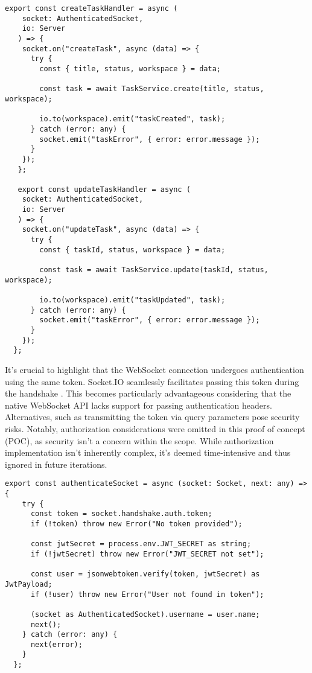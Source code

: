 \begin{lstlisting}[caption=WebSocket task events handlers]
  export const createTaskHandler = async (
    socket: AuthenticatedSocket,
    io: Server
   ) => {
    socket.on("createTask", async (data) => {
      try {
        const { title, status, workspace } = data;
   
        const task = await TaskService.create(title, status, workspace);
   
        io.to(workspace).emit("taskCreated", task);
      } catch (error: any) {
        socket.emit("taskError", { error: error.message });
      }
    });
   };
   
   export const updateTaskHandler = async (
    socket: AuthenticatedSocket,
    io: Server
   ) => {
    socket.on("updateTask", async (data) => {
      try {
        const { taskId, status, workspace } = data;
   
        const task = await TaskService.update(taskId, status, workspace);
   
        io.to(workspace).emit("taskUpdated", task);
      } catch (error: any) {
        socket.emit("taskError", { error: error.message });
      }
    });
  };
\end{lstlisting}

It's crucial to highlight that the WebSocket connection undergoes authentication using the same token. Socket.IO seamlessly facilitates passing this token during the handshake \cite{socketio}. This becomes particularly advantageous considering that the native WebSocket API lacks support for passing authentication headers. Alternatives, such as transmitting the token via query parameters pose security risks. Notably, authorization considerations were omitted in this proof of concept (POC), as security isn't a concern within the scope. While authorization implementation isn't inherently complex, it's deemed time-intensive and thus ignored in future iterations.

\begin{lstlisting}[caption=Auth Middleware for the socket]
  export const authenticateSocket = async (socket: Socket, next: any) => {
    try {
      const token = socket.handshake.auth.token;
      if (!token) throw new Error("No token provided");
   
      const jwtSecret = process.env.JWT_SECRET as string;
      if (!jwtSecret) throw new Error("JWT_SECRET not set");
   
      const user = jsonwebtoken.verify(token, jwtSecret) as JwtPayload;
      if (!user) throw new Error("User not found in token");
   
      (socket as AuthenticatedSocket).username = user.name;
      next();
    } catch (error: any) {
      next(error);
    }
  };
\end{lstlisting}

